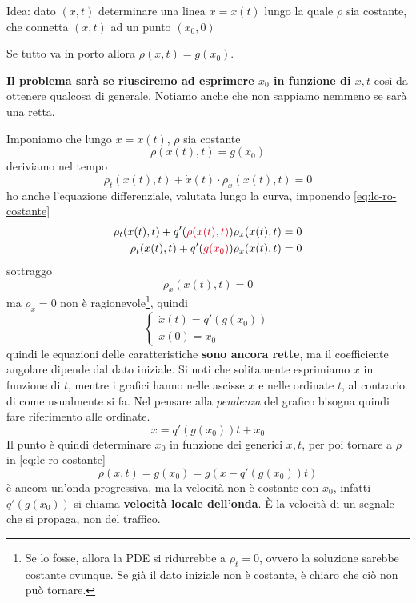 \documentclass[10pt,a4paper,twoside,openright]{book}
\begin{document}
Idea: dato $(x,t)$ determinare una linea $x=x(t)$ lungo la quale $\rho $ sia costante, che connetta $(x,t)$ ad un punto $(x_{0} ,0)$


Se tutto va in porto allora $\rho (x,t) =g(x_{0})$.

\textbf{Il problema sarà se riusciremo ad esprimere $x_{0}$ in funzione di $x,t$} così da ottenere qualcosa di generale. Notiamo anche che non sappiamo nemmeno se sarà una retta.

Imponiamo che lungo $x=x(t)$, $\rho $ sia costante
\begin{equation}
	\rho (x(t) ,t) =g(x_{0})
	\label{eq:lc-ro-costante}
\end{equation}
deriviamo nel tempo
\begin{equation*}
	\rho _{t}(x(t) ,t) +\dot{x}(t) \cdotp \rho _{x}(x(t) ,t) =0
\end{equation*}
ho anche l'equazione differenziale, valutata lungo la curva, imponendo \eqref{eq:lc-ro-costante}
\begin{align*}
	\rho _{t}(x(t) ,t) +q'(\textcolor[rgb]{0.82,0.01,0.11}{\rho (x(t) ,t)}) \rho _{x}(x(t) ,t) &=0\\
	\rho _{t}(x(t) ,t) +q'(\textcolor[rgb]{0.82,0.01,0.11}{g(x_{0})}) \rho _{x}(x(t) ,t) &=0
\end{align*}
sottraggo
\begin{equation*}
	[\dot{x}(t) -q'(g(x_{0}))] \rho _{x}(x(t) ,t) =0
\end{equation*}
ma $\rho _{x} =0$ non è ragionevole\footnote{Se lo fosse, allora la PDE si ridurrebbe a $\rho _{t}=0$, ovvero la soluzione sarebbe costante ovunque. Se già il dato iniziale non è costante, è chiaro che ciò non può tornare.}, quindi
\begin{equation*}
	\begin{cases}
		\dot{x}(t) =q'(g(x_{0})) \\
		x(0) =x_{0}                
	\end{cases}
\end{equation*}
quindi le equazioni delle caratteristiche \textbf{sono ancora rette}, ma il coefficiente angolare dipende dal dato iniziale. Si noti che solitamente esprimiamo $x$ in funzione di $t$, mentre i grafici hanno nelle ascisse $x$ e nelle ordinate $t$, al contrario di come usualmente si fa. Nel pensare alla \emph{pendenza} del grafico bisogna quindi fare riferimento alle ordinate.
\begin{equation}
	x=q'(g(x_{0})) t+x_{0}
\end{equation}
Il punto è quindi determinare $x_{0}$ in funzione dei generici $x,t$, per poi tornare a $\rho $ in \eqref{eq:lc-ro-costante}
\begin{equation}
	\rho (x,t) =g(x_{0}) =g(x-q'(g(x_{0})) t)
	\label{eq:lc-sol-ro-traffico}
\end{equation}
è ancora un'onda progressiva, ma la velocità non è costante con $x_{0}$, infatti $q'(g(x_{0}))$ si chiama \textbf{velocità locale dell'onda}. È la velocità di un segnale che si propaga, non del traffico.
\end{document}
